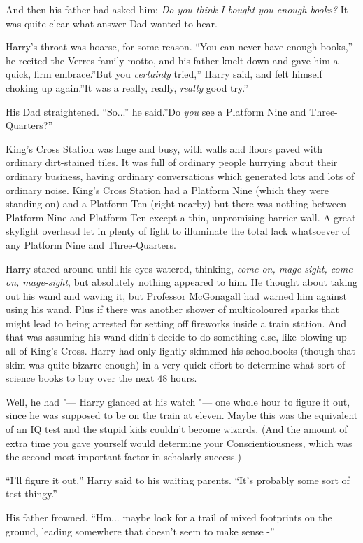 And then his father had asked him: \emph{Do you think I bought you
enough books?} It was quite clear what answer Dad wanted to hear.

Harry's throat was hoarse, for some reason. ``You can never have enough
books,'' he recited the Verres family motto, and his father knelt down
and gave him a quick, firm embrace.''But you \emph{certainly} tried,''
Harry said, and felt himself choking up again.''It was a really, really,
\emph{really} good try.''

His Dad straightened. ``So...'' he said.''Do \emph{you} see a
Platform Nine and Three-Quarters?''

King's Cross Station was huge and busy, with walls and floors paved with
ordinary dirt-stained tiles. It was full of ordinary people hurrying
about their ordinary business, having ordinary conversations which
generated lots and lots of ordinary noise. King's Cross Station had a
Platform Nine (which they were standing on) and a Platform Ten (right
nearby) but there was nothing between Platform Nine and Platform Ten
except a thin, unpromising barrier wall. A great skylight overhead let
in plenty of light to illuminate the total lack whatsoever of any
Platform Nine and Three-Quarters.

Harry stared around until his eyes watered, thinking, \emph{come on,
mage-sight, come on, mage-sight}, but absolutely nothing appeared to
him. He thought about taking out his wand and waving it, but Professor
McGonagall had warned him against using his wand. Plus if there was
another shower of multicoloured sparks that might lead to being arrested
for setting off fireworks inside a train station. And that was assuming
his wand didn't decide to do something else, like blowing up all of
King's Cross. Harry had only lightly skimmed his schoolbooks (though
that skim was quite bizarre enough) in a very quick effort to determine
what sort of science books to buy over the next 48 hours.

Well, he had "--- Harry glanced at his watch "--- one whole hour to figure it
out, since he was supposed to be on the train at eleven. Maybe this was
the equivalent of an IQ test and the stupid kids couldn't become
wizards. (And the amount of extra time you gave yourself would determine
your Conscientiousness, which was the second most important factor in
scholarly success.)

``I'll figure it out,'' Harry said to his waiting parents. ``It's
probably some sort of test thingy.''

His father frowned. ``Hm... maybe look for a trail of mixed
footprints on the ground, leading somewhere that doesn't seem to make
sense -''

